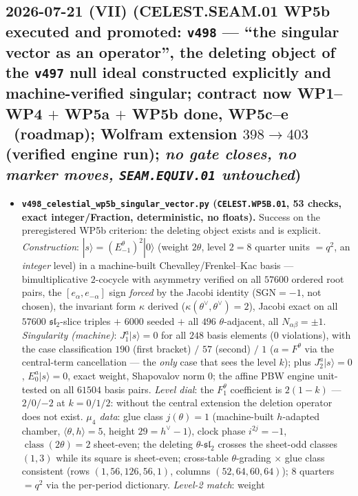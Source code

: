 \subsection*{2026-07-21 (VII) (CELEST.SEAM.01 WP5b executed and promoted: \texttt{v498} --- ``the singular vector as an operator'', the deleting object of the \texttt{v497} null ideal constructed explicitly and machine-verified singular; contract now WP1--WP4 $+$ WP5a $+$ WP5b done, WP5c--e \mO\ (roadmap); Wolfram extension $398\to403$ (verified engine run); \emph{no gate closes, no marker moves, \texttt{SEAM.EQUIV.01} untouched})}
\begin{itemize}[leftmargin=1.5em]
\item \textbf{\texttt{v498\_celestial\_wp5b\_singular\_vector.py} (\texttt{CELEST.WP5B.01}, 53 checks,
exact integer/Fraction, deterministic, no floats).} Success on the preregistered WP5b criterion: the
deleting object exists and is explicit. \emph{Construction}: $|s\rangle=(E^\theta_{-1})^2|0\rangle$
(weight $2\theta$, level $2=8$ quarter units $=q^2$, an \emph{integer} level) in a machine-built
Chevalley/Frenkel--Kac basis --- bimultiplicative $2$-cocycle with asymmetry verified on all $57600$
ordered root pairs, the $[e_\alpha,e_{-\alpha}]$ sign \emph{forced} by the Jacobi identity
($\mathrm{SGN}=-1$, not chosen), the invariant form $\kappa$ derived
($\kappa(\theta^\vee,\theta^\vee)=2$), Jacobi exact on all $57600$ $\mathfrak{sl}_2$-slice triples $+$
$6000$ seeded $+$ all $496$ $\theta$-adjacent, all $N_{\alpha\beta}=\pm1$. \emph{Singularity
(machine)}: $J^a_1|s\rangle=0$ for all $248$ basis elements ($0$ violations), with the case
classification $190$ (first bracket) $/$ $57$ (second) $/$ $1$ ($a=F^\theta$ via the central-term
cancellation --- the \emph{only} case that sees the level $k$); plus $J^a_2|s\rangle=0$,
$E^a_0|s\rangle=0$, exact weight, Shapovalov norm $0$; the affine PBW engine unit-tested on all $61504$
basis pairs. \emph{Level dial}: the $F^\theta_1$ coefficient is $2(1{-}k)$ --- $2/0/{-2}$ at $k=0/1/2$:
without the central extension the deletion operator does not exist. \emph{$\mu_4$ data}: glue class
$j(\theta)=1$ (machine-built $h$-adapted chamber, $\langle\theta,h\rangle=5$, height $29=h^\vee{-}1$),
clock phase $i^{2j}=-1$, $\operatorname{class}(2\theta)=2$ sheet-even; the deleting
$\theta$-$\mathfrak{sl}_2$ crosses the sheet-odd classes $(1,3)$ while its square is sheet-even;
cross-table $\theta$-grading $\times$ glue class consistent (rows $(1,56,126,56,1)$, columns
$(52,64,60,64)$); $8$ quarters $=q^2$ via the per-period dictionary. \emph{Level-2 match}: weight

\end{itemize}

